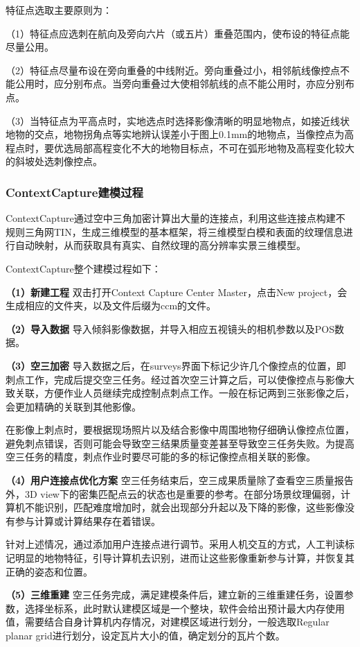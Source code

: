 特征点选取主要原则为：

（1）特征点应选刺在航向及旁向六片（或五片）重叠范围内，使布设的特征点能尽量公用。

（2）特征点尽量布设在旁向重叠的中线附近。旁向重叠过小，相邻航线像控点不能公用时，应分别布点。当旁向重叠过大使相邻航线的点不能公用时，亦应分别布点。

（3）当特征点为平高点时，实地选点时选择影像清晰的明显地物点，如接近线状地物的交点，地物拐角点等实地辨认误差小于图上0.1mm的地物点，当像控点为高程点时，要优选局部高程变化不大的地物目标点，不可在弧形地物及高程变化较大的斜坡处选刺像控点。

\subsubsection{ContextCapture建模过程}\label{contextcaptureux5efaux6a21ux8fc7ux7a0b}

ContextCapture通过空中三角加密计算出大量的连接点，利用这些连接点构建不规则三角网TIN，生成三维模型的基本框架，将三维模型白模和表面的纹理信息进行自动映射，从而获取具有真实、自然纹理的高分辨率实景三维模型。

ContextCapture整个建模过程如下：

\textbf{（1）新建工程} 双击打开Context Capture Center Master，点击New
project，会生成相应的文件夹，以及文件后缀为ccm的文件。

\textbf{（2）导入数据}
导入倾斜影像数据，并导入相应五视镜头的相机参数以及POS数据。

\textbf{（3）空三加密}
导入数据之后，在surveys界面下标记少许几个像控点的位置，即刺点工作，完成后提交空三任务。经过首次空三计算之后，可以使像控点与影像大致关联，方便作业人员继续完成控制点刺点工作。一般在标记两到三张影像之后，会更加精确的关联到其他影像。

在影像上刺点时，要根据现场照片以及结合影像中周围地物仔细确认像控点位置，避免刺点错误，否则可能会导致空三结果质量变差甚至导致空三任务失败。为提高空三任务的精度，刺点作业时要尽可能的多的标记像控点相关联的影像。

\textbf{（4）用户连接点优化方案}
空三任务结束后，空三成果质量除了查看空三质量报告外，3D
view下的密集匹配点云的状态也是重要的参考。在部分场景纹理偏弱，计算机不能识别，匹配难度增加时，就会出现部分升起以及下降的影像，这些影像没有参与计算或计算结果存在着错误。

针对上述情况，通过添加用户连接点进行调节。采用人机交互的方式，人工判读标记明显的地物特征，引导计算机去识别，进而让这些影像重新参与计算，并恢复其正确的姿态和位置。

\textbf{（5）三维重建}
空三任务完成，满足建模条件后，建立新的三维重建任务，设置参数，选择坐标系，此时默认建模区域是一个整块，软件会给出预计最大内存使用值，需要结合自身计算机内存情况，对建模区域进行划分，一般选取Regular
planar grid进行划分，设定瓦片大小的值，确定划分的瓦片个数。

